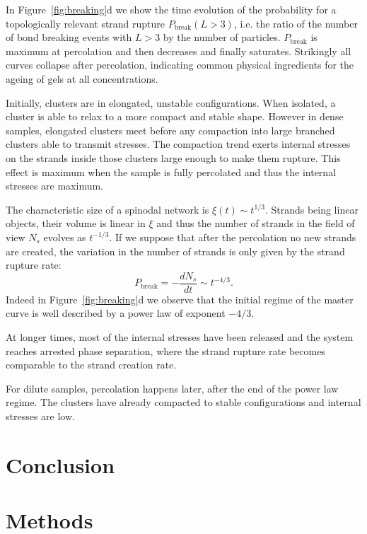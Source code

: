 In Figure~\ref{fig:breaking}d we show the time evolution of the probability for a topologically relevant strand rupture $P_\text{break}(L>3)$, i.e. the ratio of the number of bond breaking events with $L>3$ by the number of particles. $P_\text{break}$ is maximum at percolation and then decreases and finally saturates. Strikingly all curves collapse after percolation, indicating common physical ingredients for the ageing of gels at all concentrations.

Initially, clusters are in elongated, unstable configurations. When isolated, a cluster is able to relax to a more compact and stable shape. However in dense samples, elongated clusters meet before any compaction into large branched clusters able to transmit stresses. The compaction trend exerts internal stresses on the strands inside those clusters large enough to make them rupture. This effect is maximum when the sample is fully percolated and thus the internal stresses are maximum.

The characteristic size of a spinodal network is $\xi(t)\sim t^{1/3}$. Strands being linear objects, their volume is linear in $\xi$ and thus the number of strands in the field of view $N_s$ evolves as $t^{-1/3}$. If we suppose that after the percolation no new strands are created, the variation in the number of strands is only given by the strand rupture rate:
\begin{equation}
P_\text{break} = -\frac{d N_s}{dt} \sim t^{-4/3}.
\end{equation}
Indeed in Figure~\ref{fig:breaking}d we observe that the initial regime of the master curve is well described by a power law of exponent $-4/3$. 

At longer times, most of the internal stresses have been released and the system reaches arrested phase separation, where the strand rupture rate becomes comparable to the strand creation rate.

For dilute samples, percolation happens later, after the end of the power law regime. The clusters have already compacted to stable configurations and internal stresses are low.




\section{Conclusion}




\section*{Methods}

